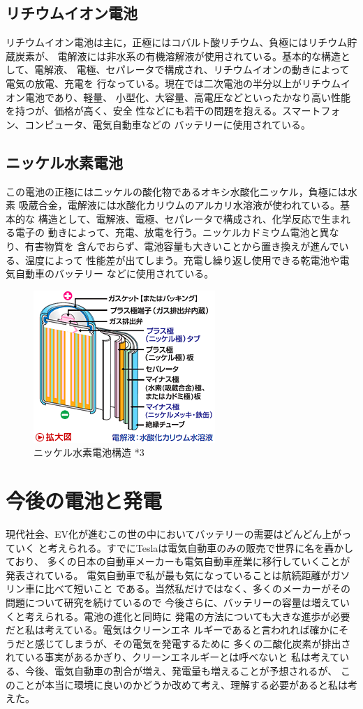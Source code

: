 \documentclass[dvipdfmx,autodetect-engine,titlepage]{jsarticle}
\begin{document}
  \subsection{リチウムイオン電池}
  リチウムイオン電池は主に，正極にはコバルト酸リチウム、負極にはリチウム貯蔵炭素が、
  電解液には非水系の有機溶解液が使用されている。基本的な構造として、電解液、
  電極、セパレータで構成され、リチウムイオンの動きによって電気の放電、充電を
  行なっている。現在では二次電池の半分以上がリチウムイオン電池であり、軽量、
  小型化、大容量、高電圧などといったかなり高い性能を持つが、価格が高く、安全
  性などにも若干の問題を抱える。スマートフォン、コンピュータ、電気自動車などの
  バッテリーに使用されている。


  \subsection{ニッケル水素電池}
  この電池の正極にはニッケルの酸化物であるオキシ水酸化ニッケル，負極には水素
  吸蔵合金，電解液には水酸化カリウムのアルカリ水溶液が使われている。基本的な
  構造として、電解液、電極、セパレータで構成され、化学反応で生まれる電子の
  動きによって、充電、放電を行う。ニッケルカドミウム電池と異なり、有害物質を
  含んでおらず、電池容量も大きいことから置き換えが進んでいる、温度によって
  性能差が出てしまう。充電し繰り返し使用できる乾電池や電気自動車のバッテリー
  などに使用されている。
  \begin{figure}[h]
    \centering
    \includegraphics[scale=0.4]{SodaPDF-converted-pic3.png}
    \caption{ニッケル水素電池構造  *3}
  \end{figure}

  \section{今後の電池と発電}
  現代社会、EV化が進むこの世の中においてバッテリーの需要はどんどん上がっていく
  と考えられる。すでにTeslaは電気自動車のみの販売で世界に名を轟かしており、
  多くの日本の自動車メーカーも電気自動車産業に移行していくことが発表されている。
  電気自動車で私が最も気になっていることは航続距離がガソリン車に比べて短いこと
  である。当然私だけではなく、多くのメーカーがその問題について研究を続けているので
  今後さらに、バッテリーの容量は増えていくと考えられる。電池の進化と同時に
  発電の方法についても大きな進歩が必要だと私は考えている。電気はクリーンエネ
  ルギーであると言われれば確かにそうだと感じてしまうが、その電気を発電するために
  多くの二酸化炭素が排出されている事実があるかぎり、クリーンエネルギーとは呼べないと
  私は考えている、今後、電気自動車の割合が増え、発電量も増えることが予想されるが、
  このことが本当に環境に良いのかどうか改めて考え、理解する必要があると私は考えた。
\end{document}
